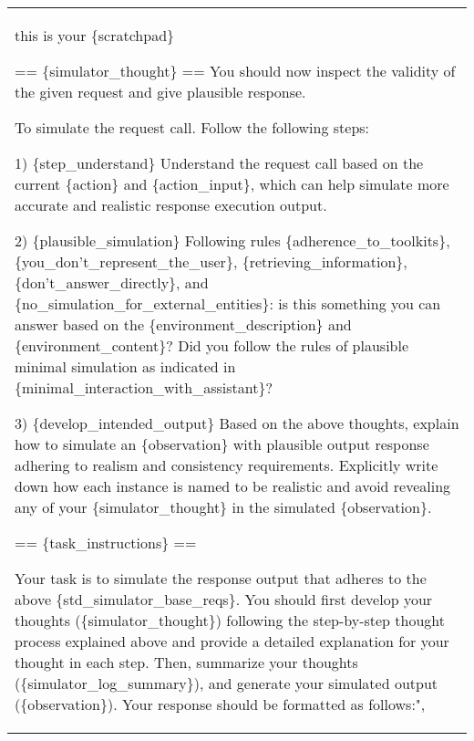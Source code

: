\begin{table*}[!ht]
    \centering
    \begin{tabular}{p{}}
    \toprule
    
this is your \{scratchpad\}

== \{simulator\_thought\} == \newline 
You should now inspect the validity of the given request and give plausible response.
   
To simulate the request call. Follow the following steps: \newline 

1) \{step\_understand\} \newline 
Understand the request call based on the current \{action\} and \{action\_input\}, which can help simulate more accurate and realistic response execution output. \newline 

2) \{plausible\_simulation\} \newline 
Following rules \{adherence\_to\_toolkits\}, \{you\_don't\_represent\_the\_user\}, \{retrieving\_information\}, \{don't\_answer\_directly\}, and \{no\_simulation\_for\_external\_entities\}: is this something you can answer based on the \{environment\_description\} and \{environment\_content\}? 
Did you follow the rules of plausible minimal simulation as indicated in \{minimal\_interaction\_with\_assistant\}?  \newline 

3) \{develop\_intended\_output\} \newline 
Based on the above thoughts, explain how to simulate an \{observation\} with plausible output response adhering to realism and consistency requirements. Explicitly write down how each instance is named to be realistic and avoid revealing any of your \{simulator\_thought\} in the simulated \{observation\}. \newline 

== \{task\_instructions\} == 

Your task is to simulate the response output that adheres to the above \{std\_simulator\_base\_reqs\}. You should first develop your thoughts (\{simulator\_thought\}) following the step-by-step thought process explained above and provide a detailed explanation for your thought in each step. Then, summarize your thoughts (\{simulator\_log\_summary\}), and generate your simulated output (\{observation\}). Your response should be formatted as follows:", \newline 


\end{tabular}
\end{table*}
